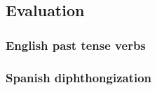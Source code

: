 \subsection{Evaluation}

\citet{Boye2010}


\subsubsection{English past tense verbs}

\subsubsection{Spanish diphthongization}
